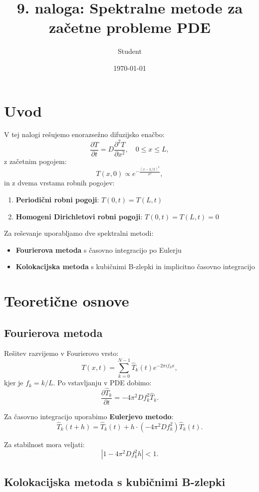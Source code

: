 \documentclass[12pt,a4paper]{article}
\title{9. naloga: Spektralne metode za začetne probleme PDE}
\author{Student}
\date{\today}
\begin{document}
\maketitle

\section{Uvod}

V tej nalogi rešujemo enorazsežno difuzijsko enačbo:
\[
\frac{\partial T}{\partial t} = D \frac{\partial^2 T}{\partial x^2}, \quad 0 \leq x \leq L,
\]
z začetnim pogojem:
\[
T(x,0) \propto e^{-\frac{(x - L/2)^2}{\sigma^2}},
\]
in z dvema vrstama robnih pogojev:
\begin{enumerate}
    \item \textbf{Periodični robni pogoji}: $T(0,t) = T(L,t)$
    \item \textbf{Homogeni Dirichletovi robni pogoji}: $T(0,t) = T(L,t) = 0$
\end{enumerate}

Za reševanje uporabljamo dve spektralni metodi:
\begin{itemize}
    \item \textbf{Fourierova metoda} s časovno integracijo po Eulerju
    \item \textbf{Kolokacijska metoda} s kubičnimi B-zlepki in implicitno časovno integracijo
\end{itemize}

\section{Teoretične osnove}

\subsection{Fourierova metoda}

Rešitev razvijemo v Fourierovo vrsto:
\[
T(x,t) = \sum_{k=0}^{N-1} \hat{T}_k(t) e^{-2\pi i f_k x},
\]
kjer je $f_k = k/L$. Po vstavljanju v PDE dobimo:
\[
\frac{\partial \hat{T}_k}{\partial t} = -4\pi^2 D f_k^2 \hat{T}_k.
\]

Za časovno integracijo uporabimo \textbf{Eulerjevo metodo}:
\[
\hat{T}_k(t+h) = \hat{T}_k(t) + h \cdot (-4\pi^2 D f_k^2) \hat{T}_k(t).
\]

Za stabilnost mora veljati:
\[
|1 - 4\pi^2 D f_k^2 h| < 1.
\]

\subsection{Kolokacijska metoda s kubičnimi B-zlepki}
\end{document}
